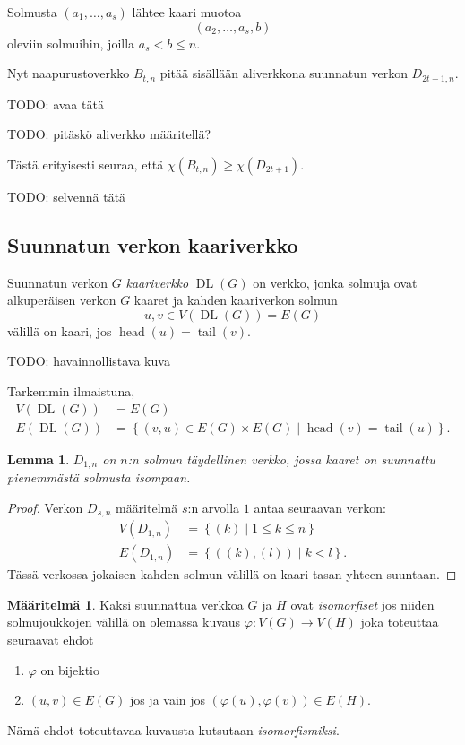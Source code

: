 \documentclass[finnish]{tktltiki2}
\newtheorem{lem}[lau]{Lemma}
\theoremstyle{definition}
\newtheorem{maar}[lau]{Määritelmä}
\theoremstyle{remark}
\newcommand{\set}[1]{\left\{ #1 \right\}}
\newcommand{\from}{\colon}
\DeclareMathOperator{\head}{head}
\DeclareMathOperator{\tail}{tail}
\DeclareMathOperator{\DL}{DL}
\newcommand{\Dsn}{D_{s,n}}
\begin{document}
Solmusta $(a_1,\dots,a_s)$ lähtee kaari muotoa
%
\begin{equation*}
    (a_2,\dots,a_s,b)
\end{equation*}
%
oleviin solmuihin, joilla $a_s < b \leq n$.

Nyt naapurustoverkko $B_{t,n}$ pitää sisällään aliverkkona suunnatun verkon
$D_{2t+1,n}$.

TODO: avaa tätä

TODO: pitäskö aliverkko määritellä?

Tästä erityisesti seuraa, että $\chi(B_{t,n}) \geq \chi(D_{2t+1})$.

TODO: selvennä tätä



\subsection{Suunnatun verkon kaariverkko}

Suunnatun verkon $G$ \emph{kaariverkko} $\DL(G)$ on verkko, jonka solmuja ovat
alkuperäisen verkon $G$ kaaret ja kahden kaariverkon solmun
%
\begin{equation*}
    u,v \in V(\DL(G)) = E(G)
\end{equation*}
%
välillä on kaari, jos $\head(u) = \tail(v)$.

TODO: havainnollistava kuva

Tarkemmin ilmaistuna,
%
\begin{align*}
    V(\DL(G)) &= E(G) \\
    E(\DL(G)) &= \set{(v,u) \in E(G) \times E(G) \mid \head(v) = \tail(u)}.
\end{align*}


\begin{lem}
    $D_{1,n}$ on $n$:n solmun täydellinen verkko, jossa kaaret on suunnattu pienemmästä solmusta isompaan.
\end{lem}

\begin{proof}
    Verkon $\Dsn$ määritelmä $s$:n arvolla $1$ antaa seuraavan verkon:
    \begin{align*}
        V(D_{1,n}) &= \set{(k) \mid 1 \leq k \leq n} \\
        E(D_{1,n}) &= \set{((k), (l)) \mid k < l}.
    \end{align*}
    Tässä verkossa jokaisen kahden solmun välillä on kaari tasan yhteen
    suuntaan.
\end{proof}

\begin{maar}
    Kaksi suunnattua verkkoa $G$ ja $H$ ovat \emph{isomorfiset} jos niiden
    solmujoukkojen välillä on olemassa kuvaus $\varphi \from V(G) \to V(H)$
    joka toteuttaa seuraavat ehdot
    \begin{enumerate}
        \item $\varphi$ on bijektio
        \item $(u,v) \in E(G)$ jos ja vain jos $(\varphi(u), \varphi(v)) \in
            E(H)$.
    \end{enumerate}
    Nämä ehdot toteuttavaa kuvausta kutsutaan \emph{isomorfismiksi}.
\end{maar}
\end{document}
